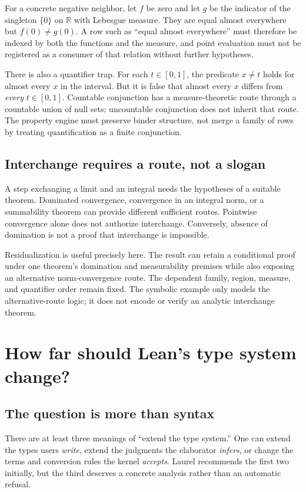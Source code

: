 \documentclass[11pt,a4paper]{article}
\newcommand{\code}[1]{\texttt{\detokenize{#1}}}
\newcommand{\R}{\mathbb R}
\theoremstyle{definition}
\theoremstyle{remark}
\begin{document}
For a concrete negative neighbor, let $f$ be zero and let $g$ be the indicator of the singleton $\{0\}$ on $\R$ with Lebesgue measure. They are equal almost everywhere but $f(0)\ne g(0)$. A row such as ``equal almost everywhere'' must therefore be indexed by both the functions and the measure, and point evaluation must not be registered as a consumer of that relation without further hypotheses.

There is also a quantifier trap. For each $t\in[0,1]$, the predicate $x\ne t$ holds for almost every $x$ in the interval. But it is false that almost every $x$ differs from \emph{every} $t\in[0,1]$. Countable conjunction has a measure-theoretic route through a countable union of null sets; uncountable conjunction does not inherit that route. The property engine must preserve binder structure, not merge a family of rows by treating quantification as a finite conjunction.

\subsection{Interchange requires a route, not a slogan}
A step exchanging a limit and an integral needs the hypotheses of a suitable theorem. Dominated convergence, convergence in an integral norm, or a summability theorem can provide different sufficient routes. Pointwise convergence alone does not authorize interchange. Conversely, absence of domination is not a proof that interchange is impossible.

Residualization is useful precisely here. The result can retain a conditional proof under one theorem's domination and measurability premises while also exposing an alternative norm-convergence route. The dependent family, region, measure, and quantifier order remain fixed. The symbolic \code{alternatives.laurel} example only models the alternative-route logic; it does not encode or verify an analytic interchange theorem.

\section{How far should Lean's type system change?}\label{sec:kernel}
\subsection{The question is more than syntax}
There are at least three meanings of ``extend the type system.'' One can extend the types users \emph{write}, extend the judgments the elaborator \emph{infers}, or change the terms and conversion rules the kernel \emph{accepts}. Laurel recommends the first two initially, but the third deserves a concrete analysis rather than an automatic refusal.
\end{document}
